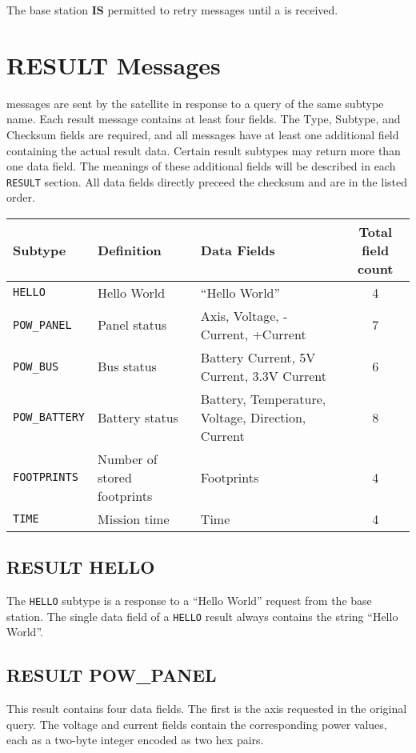 \documentclass{article}
\begin{document}
  The base station \textbf{IS} permitted to retry \mquery messages until a \mresult is received.
  
 
\pagebreak
\section{RESULT Messages}
  \mresult messages are sent by the satellite in response to a query of the same subtype name. Each result message contains at least four fields.
  The Type, Subtype, and Checksum fields are required, and all \mresult messages have at least one additional field containing the actual result
  data. Certain result subtypes may return more than one data field. The meanings of these additional
  fields will be described in each \texttt{RESULT} section. All data fields directly preceed the checksum and are in the listed order.
  
  \begin{center}
    \begin{tabular}{| l | l | l | c |}
      \hline
      Subtype & Definition & Data Fields & Total field count \\ \hline
      \texttt{HELLO} & Hello World & ``Hello World'' & 4\\
      \texttt{POW\_PANEL} & Panel status & Axis, Voltage, -Current, +Current & 7\\
      \texttt{POW\_BUS} & Bus status & Battery Current, 5V Current, 3.3V Current & 6 \\
      \texttt{POW\_BATTERY} & Battery status & Battery, Temperature, Voltage, Direction, Current & 8 \\
      \texttt{FOOTPRINTS} & Number of stored footprints & Footprints & 4\\
      \texttt{TIME} & Mission time & Time & 4\\
      \hline
    \end{tabular}
  \end{center}
  
  \subsection{RESULT HELLO}
    The \texttt{HELLO} subtype is a response to a ``Hello World'' request from the base station.
    The single data field of a \texttt{HELLO} result always contains the string ``Hello World''.

    
  \subsection{RESULT POW\_PANEL}
    This result contains four data fields. The first is the axis requested in the original query.
    The voltage and current fields contain the corresponding power values, each as a two-byte integer encoded as two hex 
    pairs.
    
\end{document}
